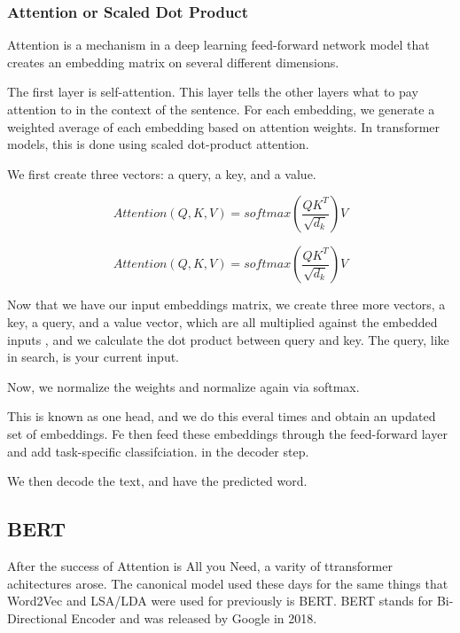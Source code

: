 \documentclass[11pt]{diazessay} %
\begin{document}
\subsubsection{Attention or Scaled Dot Product}

Attention is a mechanism in a deep learning feed-forward network model that creates an embedding matrix on several different dimensions\citep{amatriain2023transformer}. 

The first layer is self-attention. This layer tells the other layers what to pay attention to in the context of the sentence.  For each embedding, we generate a weighted average of each embedding based on attention weights. In transformer models, this is done using scaled dot-product attention. 

We first create three vectors:  a query, a key, and a value. 

\begin{equation}
Attention(Q, K, V) = softmax(\frac{QK^T}{\sqrt{d_k}})V
\end{equation}

\begin{equation}
Attention(Q, K, V) = softmax(\frac{QK^T}{\sqrt{d_k}})V
\end{equation}


Now that we have our input embeddings matrix, we create three more vectors, a key, a query, and a value vector, which are all multiplied against the embedded inputs , and we calculate the dot product between query and key. The query, like in search,  is your current input. 

Now, we normalize the weights and normalize again via softmax.

This is known as one head, and we do this everal times and obtain an updated set of embeddings.  Fe then feed these embeddings through the feed-forward layer and add task-specific classifciation. in the decoder step. 

We then decode the text, and have the predicted word. 

\subsection{BERT}

After the success of Attention is All you Need, a varity of ttransformer achitectures arose. The canonical model used these days for the same things that Word2Vec and LSA/LDA were used for previously is BERT. BERT stands for Bi-Directional Encoder and was released by Google in 2018\citep{devlin2018bert}. 
\end{document}
